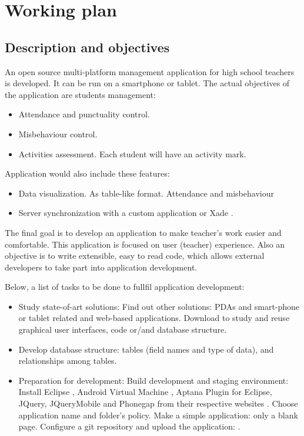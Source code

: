 \chapter{Working plan}
\section{Description and objectives}

	An open source multi-platform management application for high school teachers is developed. It can be run on a smartphone or tablet. 
	The actual objectives of the application are students management:
	\begin{itemize}
	  \item Attendance and punctuality control. 
	  \item Misbehaviour control.
	  \item Activities assessment. Each student will have an activity mark.
	\end{itemize}

	Application would also include these features:
	\begin{itemize}
	  \item Data visualization. As table-like format. Attendance and misbehaviour
	  \item Server synchronization with a custom application or Xade \cite{Xade}.
	\end{itemize}

	The final goal is to develop an application to make teacher's work easier and comfortable. This application is focused on user  (teacher) experience.
	Also an objective is to write extensible, easy to read code, which allows external developers to take part into application development.
	
	Below, a list of tasks to be done to fullfil application development:
	\begin{itemize}
	  \item Study state-of-art solutions: 
  \subitem  Find out other solutions: PDAs and smart-phone or tablet related and web-based applications.
  \subitem  Download to study and reuse graphical user interfaces, code or/and database structure. 
  \item   Develop database structure: tables (field names and type of data), and relationships among tables. 
  \item   Preparation for development:
\subitem  Build development and staging environment: 
\subsubitem Install Eclipse \cite{Eclipse}, Android Virtual Machine \cite{AndroidDevelopmentKit}, Aptana Plugin for Eclipse, JQuery, JQueryMobile \cite{JQueryMobile} and Phonegap \cite{PhoneGap} from their respective websites \cite{PhoneGapGS}.
\subitem   Choose application name and folder's policy.
\subitem   Make a simple application: only a blank page.
\subitem  Configure a git repository and upload the application: \cite{EduXes}.
	\end{itemize}
	
